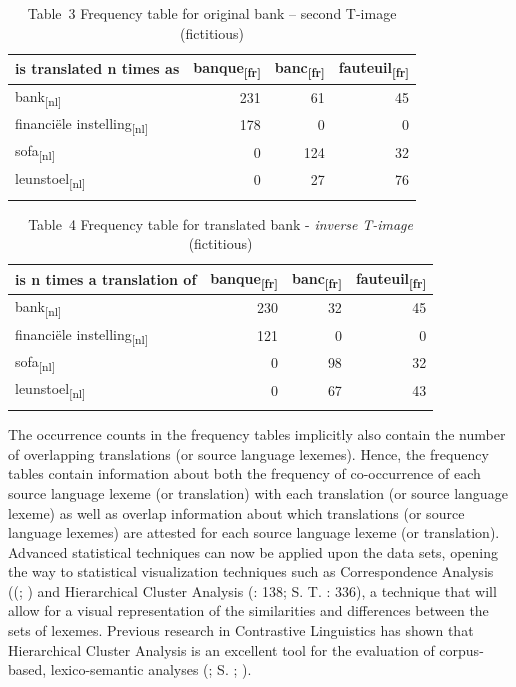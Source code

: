\begin{table}
\caption{Table~3  Frequency table for original bank – second T-image (fictitious)\label{tab:key:3}}
\begin{tabularx}{\textwidth}{Xrrr}
\lsptoprule
{is} {translated} {n} {times} {as} & {banque\textsubscript{[fr]}} & {banc\textsubscript{[fr]}} & {fauteuil\textsubscript{[fr]}}\\\midrule
{bank\textsubscript{[nl]}} & 231 & 61 & 45\\
{financiële} {instelling\textsubscript{[nl]}} & 178 & 0 & 0\\
{sofa\textsubscript{[nl]}} & 0 & 124 & 32\\
{leunstoel\textsubscript{[nl]}} & 0 & 27 & 76\\
\lspbottomrule
\end{tabularx}
\end{table}

\begin{table}
\caption{Table~4  Frequency table for translated bank - \textit{inverse} \textit{T-image} (fictitious)\label{tab:key:}}
\begin{tabularx}{\textwidth}{Xrrr}
\lsptoprule
{is} {n} {times} a translation of & {banque\textsubscript{[fr]}} & {banc\textsubscript{[fr]}} & {fauteuil\textsubscript{[fr]}}\\\midrule
{bank\textsubscript{[nl]}} & 230 & 32 & 45\\
{financiële} {instelling\textsubscript{[nl]}} & 121 & 0 & 0\\
{sofa\textsubscript{[nl]}} & 0 & 98 & 32\\
{leunstoel\textsubscript{[nl]}} & 0 & 67 & 43\\
\lspbottomrule
\end{tabularx}
\end{table}

The occurrence counts in the frequency tables implicitly also contain the number of overlapping translations (or source language lexemes). Hence, the frequency tables contain information about both the frequency of co-occurrence of each source language lexeme (or translation) with each translation (or source language lexeme) as well as overlap information about which translations (or source language lexemes) are attested for each source language lexeme (or translation). Advanced statistical techniques can now be applied upon the data sets, opening the way to statistical visualization techniques such as Correspondence Analysis ((\citealt{greenacre_correspondence_2007}; \citealt{lebart_exploring_1998}) and Hierarchical Cluster Analysis (\citealt{baayen_analyzing_2008}: 138; S. T. \citealt{gries_statistics_2013}: 336), a technique that will allow for a visual representation of the similarities and differences between the sets of lexemes. Previous research in Contrastive Linguistics has shown that Hierarchical Cluster Analysis is an excellent tool for the evaluation of corpus-based, lexico-semantic analyses (\citealt{evans_behavioral_2009}; S. \citealt{libben_behavioral_2012}; \citealt{glynn_cluster_2014}).


